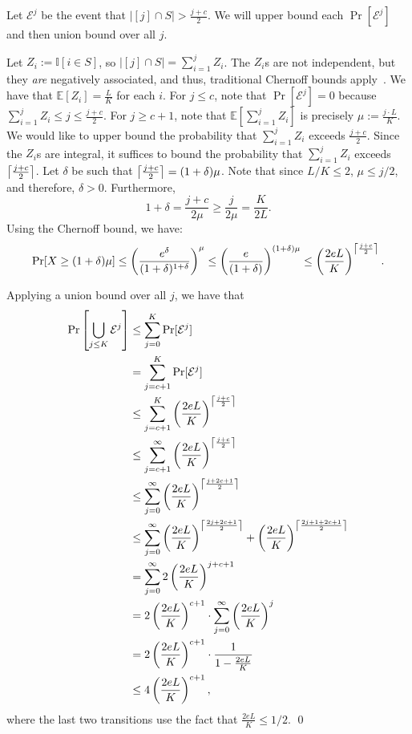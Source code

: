 	Let $\mathcal{E}^j$ be the event that $|[j] \cap S| > \frac{j + c}{2}.$ We will upper bound each $\Pr[\mathcal{E}^j]$ and then union bound  over all $j$. 
	
	Let $Z_i := \mathbb{I}[i \in S]$, so $|[j] \cap S| = \sum_{i = 1}^j Z_i$. 
    The $Z_i$s are not independent, but they \emph{are} negatively associated, and thus, traditional Chernoff bounds apply~\cite{dubhashi2009concentration}. We have  that $\mathbb{E}[Z_i] = \frac{L}{K}$ for each $i$. For $j \le c$, note that $\Pr[\mathcal{E}^j] = 0$ because $\sum_{i=1}^j Z_i \le j \le \frac{j + c}{2}$. For $j \ge c + 1$, note that $\mathbb{E}[\sum_{i = 1}^j Z_i]$ is precisely $\mu := \frac{j \cdot L}{K}$. We would like to upper bound the probability that $\sum_{i = 1}^j Z_i$ exceeds $\frac{j + c}{2}$. Since the $Z_i$s are integral, it suffices to bound the probability that  $\sum_{i = 1}^j Z_i$ exceeds $\ceil*{\frac{j + c}{2}}$. Let $\delta$ be such that  $\ceil*{\frac{j + c}{2}} = (1 + \delta) \mu$. Note that since $L/K \le 2$, $\mu \le j/2$, and therefore, $\delta > 0$. Furthermore, $$1 + \delta = \frac{j + c}{2 \mu} \ge \frac{j}{2\mu} =  \frac{K}{2 L}.$$ Using the Chernoff bound, we have:
	\[
		\Pr[X \ge (1 + \delta) \mu] \le \left(\frac{e^\delta}{(1 + \delta)^{1 + \delta}} \right)^\mu \leq  \left(\frac{e}{(1 + \delta)} \right)^{(1 + \delta)\mu} \le  \left(\frac{2 e L}{K} \right)^{\ceil*{\frac{j + c}{2}}}.
	\]
	
	Applying a union bound over all $j$, we have that
\begin{align*}
    \Pr\left[\bigcup_{j \le K} \mathcal{E}^j \right]
    &\le \sum_{j = 0}^K \Pr[\mathcal{E}^j]\\
    &= \sum_{j = c + 1}^K \Pr[\mathcal{E}^j]\\
    &\le \sum_{j = c + 1}^K \left(\frac{2 e L}{K} \right)^{\ceil*{\frac{j + c}{2}}}\\
    &\le \sum_{j = c + 1}^\infty \left(\frac{2 e L}{K} \right)^{\ceil*{\frac{j + c}{2}}}\\
    &\le \sum_{j = 0}^\infty \left(\frac{2 e L}{K} \right)^{\ceil*{\frac{j + 2c + 1}{2}}}\\
    &\le \sum_{j = 0}^\infty \left(\frac{2 e L}{K} \right)^{\ceil*{\frac{2j + 2c + 1}{2}}} + \left(\frac{2 e L}{K} \right)^{\ceil*{\frac{2j + 1 + 2c + 1}{2}}}\\
    &= \sum_{j = 0}^\infty 2 \left(\frac{2 e L}{K} \right)^{j + c + 1}\\
    &= 2 \left(\frac{2 e L}{K} \right)^{c + 1} \cdot \sum_{j = 0}^\infty \left(\frac{2 e L}{K} \right)^{j}\\
    &= 2 \left(\frac{2 e L}{K} \right)^{c + 1} \cdot \frac{1}{1 - \frac{2eL}{K}}\\
    &\le 4  \left(\frac{2 e L}{K} \right)^{c + 1},
\end{align*}
where the last two transitions use the fact that $\frac{2eL}{K} \le 1/2$. \qed

